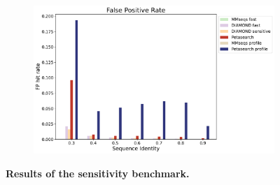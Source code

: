 \begin{figpage}
\begin{figure}
\begin{subfigure}{0.5\textwidth}
    \end{subfigure}
    \begin{subfigure}{0.5\textwidth}
      \includegraphics[width=\textwidth]{images/percFP.pdf}
    \end{subfigure}
    \caption{\textbf{Results of the sensitivity benchmark.}}
  \end{figure}
  \restoregeometry
\end{figpage}
\pagebreak
